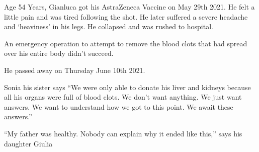 Age 54 Years, Gianluca got his AstraZeneca Vaccine on May 29th 2021. He felt a
little pain and was tired following the shot. He later suffered a severe
headache and ‘heaviness’ in his legs. He collapsed and was rushed to hospital.

An emergency operation to attempt to remove the blood clots that had spread over
his entire body didn’t succeed.

He passed away on Thursday June 10th 2021.

Sonia his sister says “We were only able to donate his liver and kidneys because
all his organs were full of blood clots. We don’t want anything. We just want
answers. We want to understand how we got to this point. We await these
answers.”

“My father was healthy. Nobody can explain why it ended like this,” says his
daughter Giulia

